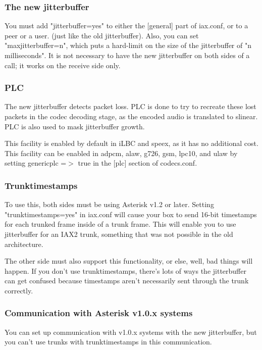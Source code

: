 \subsubsection{The new jitterbuffer}

You must add "jitterbuffer=yes" to either the [general] part of
iax.conf, or to a peer or a user.  (just like the old jitterbuffer).
Also, you can set "maxjitterbuffer=n", which puts a hard-limit on the size of the
jitterbuffer of "n milliseconds".  It is not necessary to have the new jitterbuffer
on both sides of a call; it works on the receive side only.

\subsubsection{PLC}

The new jitterbuffer detects packet loss.  PLC is done to try to recreate these
lost packets in the codec decoding stage, as the encoded audio is translated to slinear.
PLC is also used to mask jitterbuffer growth.

This facility is enabled by default in iLBC and speex, as it has no additional cost.
This facility can be enabled in adpcm, alaw, g726, gsm, lpc10, and ulaw by setting
genericplc =$>$ true in the [plc] section of codecs.conf.

\subsubsection{Trunktimestamps}

To use this, both sides must be using Asterisk v1.2 or later.
Setting "trunktimestamps=yes" in iax.conf will cause your box to send 16-bit timestamps
for each trunked frame inside of a trunk frame. This will enable you to use jitterbuffer
for an IAX2 trunk, something that was not possible in the old architecture.

The other side must also support this functionality, or else, well, bad things will happen.
If you don't use trunktimestamps, there's lots of ways the jitterbuffer can get confused because
timestamps aren't necessarily sent through the trunk correctly.

\subsubsection{Communication with Asterisk v1.0.x systems}

You can set up communication with v1.0.x systems with the new jitterbuffer, but
you can't use trunks with trunktimestamps in this communication.

